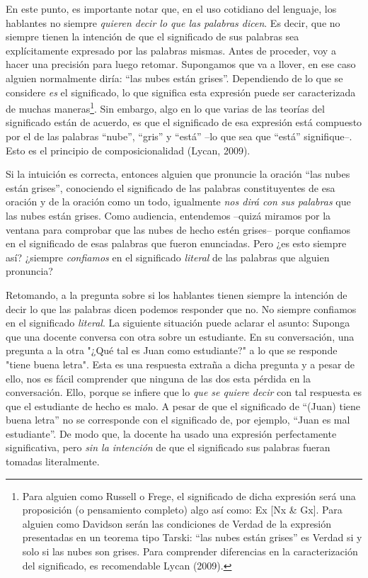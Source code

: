 \documentclass[]{book}
\begin{document}
\begin{refsection}
En este punto, es importante notar que, en el uso cotidiano del
lenguaje, los hablantes no siempre \emph{quieren decir lo que las
palabras dicen}. Es decir, que no siempre tienen la intención de que el
significado de sus palabras sea explícitamente expresado por las
palabras mismas. Antes de proceder, voy a hacer una precisión para luego
retomar. Supongamos que va a llover, en ese caso alguien normalmente
diría: ``las nubes están grises''. Dependiendo de lo que se considere
\emph{es} el significado, lo que significa esta expresión puede ser
caracterizada de muchas maneras\footnote{Para alguien como Russell o
  Frege, el significado de dicha expresión será una proposición (o
  pensamiento completo) algo así como: Ex {[}Nx \& Gx{]}. Para alguien
  como Davidson serán las condiciones de Verdad de la expresión
  presentadas en un teorema tipo Tarski: ``las nubes están grises'' es
  Verdad si y solo si las nubes son grises. Para comprender diferencias
  en la caracterización del significado, es recomendable Lycan (2009).}.
Sin embargo, algo en lo que varias de las teorías del significado están
de acuerdo, es que el significado de esa expresión está compuesto por el
de las palabras ``nube'', ``gris'' y ``está'' --lo que sea que ``está''
signifique--. Esto es el principio de composicionalidad (Lycan, 2009).

Si la intuición es correcta, entonces alguien que pronuncie la oración
``las nubes están grises'', conociendo el significado de las palabras
constituyentes de esa oración y de la oración como un todo, igualmente
\emph{nos dirá con sus palabras} que las nubes están grises. Como
audiencia, entendemos --quizá miramos por la ventana para comprobar que
las nubes de hecho estén grises-- porque confiamos en el significado de
esas palabras que fueron enunciadas. Pero ¿es esto siempre así? ¿siempre
\emph{confiamos} en el significado \emph{literal} de las palabras que
alguien pronuncia?

Retomando, a la pregunta sobre si los hablantes tienen siempre la
intención de decir lo que las palabras dicen podemos responder que no.
No siempre confiamos en el significado \emph{literal}. La siguiente
situación puede aclarar el asunto: Suponga que una docente conversa con
otra sobre un estudiante. En su conversación, una pregunta a la otra
"¿Qué tal es Juan como estudiante?" a lo que se responde "tiene buena
letra". Esta es una respuesta extraña a dicha pregunta y a pesar de
ello, nos es fácil comprender que ninguna de las dos esta pérdida en la
conversación. Ello, porque se infiere que lo \emph{que se quiere decir}
con tal respuesta es que el estudiante de hecho es malo. A pesar de que
el significado de ``(Juan) tiene buena letra'' no se corresponde con el
significado de, por ejemplo, ``Juan es mal estudiante''. De modo que, la
docente ha usado una expresión perfectamente significativa, pero
\emph{sin la intención} de que el significado sus palabras fueran
tomadas literalmente.


\end{refsection}
\end{document}
